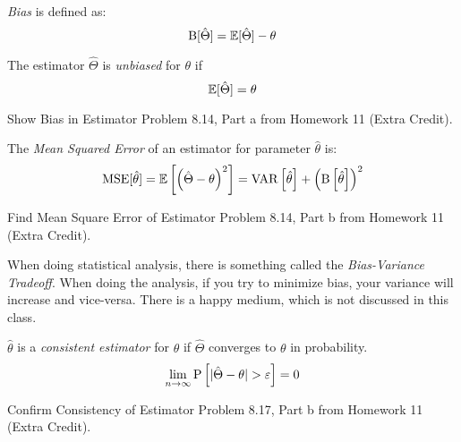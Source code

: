 			\begin{definition}[Bias] \label{def:Bias}
				\emph{Bias} is defined as:
				\begin{equation} \label{eq:Accuracy}
					\operatorname{\operatorname{B}} [ \hat{\Theta} ] = \operatorname{\operatorname{\mathbb{E}}} [ \hat{\Theta} ] - \theta
				\end{equation}
				\begin{remark} \label{rmk:Unbiased}
					The estimator $\hat{\Theta}$ is \emph{unbiased} for $\theta$ if
					\begin{equation} \label{Unbiased}
						\operatorname{\operatorname{\mathbb{E}}} [ \hat{\Theta} ] = \theta
					\end{equation}
				\end{remark}
			\end{definition}
			\begin{example}[Problem 8.14]{Show Bias in Estimator}
				Problem 8.14, Part a from Homework 11 (Extra Credit).
			\end{example}
					
			\begin{definition} \label{def:Mean Squared Error}
				The \emph{Mean Squared Error} of an estimator for parameter $\hat{\theta}$ is:
				\begin{equation} \label{eq:Mean Squared Error}
					\operatorname{\operatorname{MSE}} [ \hat{\theta} ]
					= \operatorname{\operatorname{\mathbb{E}}} \left[ \left( \hat{\Theta} - \theta \right)^{2} \right]
					= \operatorname{\operatorname{VAR}} \left[ \hat{\theta} \right] + \left( \operatorname{\operatorname{B}} \left[ \hat{\theta} \right] \right)^{2}
				\end{equation}
			\end{definition}
			\begin{example}[Problem 8.14]{Find Mean Square Error of Estimator}
				Problem 8.14, Part b from Homework 11 (Extra Credit).
			\end{example}
		
			\begin{remark*}
				When doing statistical analysis, there is something called the \emph{Bias-Variance Tradeoff}.
				When doing the analysis, if you try to minimize bias, your variance will increase and vice-versa.
				There is a happy medium, which is not discussed in this class.
			\end{remark*}
		
			\begin{definition}[Consistency] \label{def:Consistency}
				$\hat{\theta}$ is a \emph{consistent estimator} for $\theta$ if $\hat{\Theta}$ converges to $\theta$ in probability.
				\begin{equation} \label{eq:Consistency}
					\lim\limits_{n \rightarrow \infty} \operatorname{\operatorname{P}} \left[ \lvert \hat{\Theta} - \theta \rvert > \varepsilon \right] = 0
				\end{equation}
			\end{definition}
			\begin{example}[Problem 8.17]{Confirm Consistency of Estimator}
				Problem 8.17, Part b from Homework 11 (Extra Credit).
			\end{example}
	
